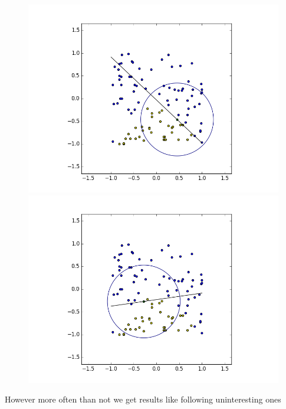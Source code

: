 \documentclass{article}
\begin{document}
\begin{figure}[H]
  \centering
  \begin{minipage}[b]{0.4\textwidth}
    \includegraphics[width=\textwidth]{BoundaryHunter-Attempt3-R0.png}
    \caption{}
  \end{minipage}
  \hfill
  \begin{minipage}[b]{0.4\textwidth}
    \includegraphics[width=\textwidth]{BoundaryHunter-Attempt3-R1.png}
    \caption{}
  \end{minipage}
  \hfill
\end{figure}

However more often than not we get results like following uninteresting ones
\end{document}
